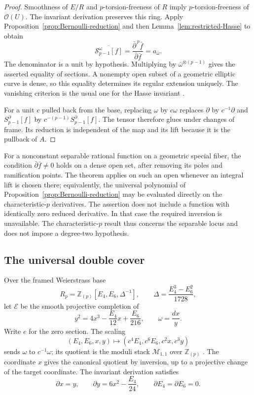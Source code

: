 \documentclass[11pt]{amsart}
\theoremstyle{definition}
\theoremstyle{remark}
\numberwithin{equation}{section}
\begin{document}
\begin{proof}
Smoothness of $E/R$ and $p$-torsion-freeness of $R$ imply
$p$-torsion-freeness of $\mathcal O(U)$. The invariant derivation
preserves this ring. Apply Proposition~\ref{prop:Bernoulli-reduction}
and then Lemma~\ref{lem:restricted-Hasse} to obtain
\[
\overline{\mathcal S_{p-1}^\omega[f]}
=\frac{\bar\partial^{\,p}\bar f}{\bar\partial\bar f}
=a_{\bar\omega}.
\]
The denominator is a unit by hypothesis. Multiplying by
$\bar\omega^{\otimes(p-1)}$ gives the asserted equality of sections.
A nonempty open subset of a geometric elliptic curve is dense, so this
equality determines its regular extension uniquely. The vanishing
criterion is the usual one for the Hasse invariant
\cite[\S2.0]{katz}.

For a unit $c$ pulled back from the base, replacing $\omega$ by
$c\omega$ replaces $\partial$ by $c^{-1}\partial$ and
$S_{p-1}^\partial[f]$ by $c^{-(p-1)}S_{p-1}^\partial[f]$.
The tensor therefore glues under changes of frame. Its reduction is
independent of the map and its lift because it is the pullback of $A$.
\end{proof}

For a nonconstant separable rational function on a geometric special
fiber, the condition $\bar\partial\bar f\neq0$ holds on a dense open
set, after removing its poles and ramification points. The theorem
applies on such an open whenever an integral lift is chosen there;
equivalently, the universal polynomial of
Proposition~\ref{prop:Bernoulli-reduction} may be evaluated directly on
the characteristic-$p$ derivatives. The assertion does not include a
function with identically zero reduced derivative. In that case the
required inversion is unavailable. The characteristic-$p$ result thus
concerns the separable locus and does not impose a degree-two
hypothesis.

\subsection{The universal double cover}

Over the framed Weierstrass base
\[
R_p=\mathbb Z_{(p)}[E_4,E_6,\Delta^{-1}],
\qquad \Delta=\frac{E_4^3-E_6^2}{1728},
\]
let $\mathcal E$ be the smooth projective completion of
\begin{equation}\label{eq:universal-algebraic-curve}
y^2=4x^3-\frac{E_4}{12}x+\frac{E_6}{216},
\qquad \omega=\frac{dx}{y}.
\end{equation}
Write $e$ for the zero section. The scaling
\[
(E_4,E_6,x,y)\longmapsto(c^4E_4,c^6E_6,c^2x,c^3y)
\]
sends $\omega$ to $c^{-1}\omega$; its quotient is the moduli stack
$\mathcal M_{1,1}$ over $\mathbb Z_{(p)}$
\cite[\S1.1 and Appendix~A1]{katz}. The coordinate $x$ gives the
canonical quotient by inversion, up to a projective change of the
target coordinate. The invariant derivation satisfies
\begin{equation}\label{eq:algebraic-derivation}
\partial x=y,\qquad
\partial y=6x^2-\frac{E_4}{24},\qquad
\partial E_4=\partial E_6=0.
\end{equation}
\end{document}
